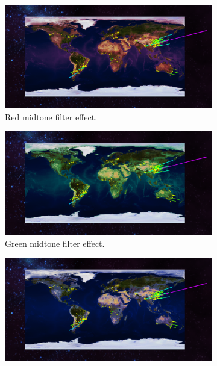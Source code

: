 
\begin{figure}[H]
	\captionsetup[subfigure]{aboveskip=8pt,belowskip=8pt}
	\newcommand{\figurewidth}{0.5\textwidth}
	\begin{subfigure}[b]{\figurewidth}
        \includegraphics[width=\textwidth]{images/implementation/shaders/red}
		\caption{Red midtone filter effect.}
		\label{fig:red_midtone}
	\end{subfigure}
	\begin{subfigure}[b]{\figurewidth}
		\includegraphics[width=\textwidth]{images/implementation/shaders/green}
		\caption{Green midtone filter effect.}
		\label{fig:green_midtone}
	\end{subfigure}
	\begin{subfigure}[b]{\figurewidth}
		\includegraphics[width=\textwidth]{images/implementation/shaders/blue}

\end{subfigure}
\end{figure}
